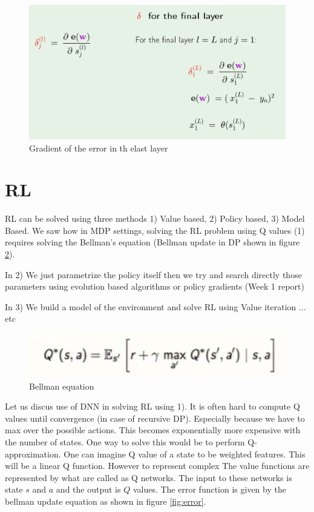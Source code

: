 \documentclass{article}[11pt]
\begin{document}
\begin{figure}[H]
  \begin{center}
    \includegraphics[width=1\linewidth]{images/lastlayer}
    \caption{Gradient of the error in th elast layer}
    \label{fig:lastlayer}
  \end{center}
\end{figure}

\section{RL}
RL can be solved using three methods 1) Value based, 2) Policy based, 3) Model Based. We saw how in MDP settings, solving the RL problem using Q values (1) requires solving the Bellman's equation (Bellman update in DP shown in figure \ref{fig:bellman}). 

In 2) We just parametrize the policy itself then we try and search directly those parameters using evolution based algorithms or policy gradients (Week 1 report) 

In 3) We build a model of the environment and solve RL using Value iteration ... etc

\begin{figure}[H]
  \begin{center}
    \includegraphics[width=0.5\linewidth]{images/bellman}
    \caption{Bellman equation}
    \label{fig:bellman}
  \end{center}
\end{figure}

Let us discus use of DNN in solving RL using 1). It is often hard to compute Q values until convergence (in case of recursive DP). Especially because we have to max over the possible actions. This becomes exponentially more expensive with the number of states. One way to solve this would be to perform Q-approximation. One can imagine Q value of a state to be weighted features. This will be a linear Q function. However to represent complex The value functions are represented by what are called as Q networks. The input to these networks is state $s$ and $a$ and the output is $Q$ values. The error function is given by the bellman update equation as shown in figure \ref{fig:error}. 
\end{document}
